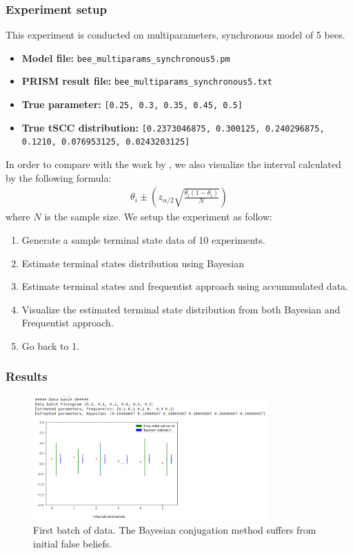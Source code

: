 \documentclass[12pt]{article}
\theoremstyle{definition}
\begin{document}
\subsubsection{Experiment setup}
This experiment is conducted on multiparameters, synchronous model of 5 bees.
\begin{itemize}
\item \textbf{Model file:} \texttt{bee\_multiparams\_synchronous5.pm}
\item \textbf{PRISM result file:} \texttt{bee\_multiparams\_synchronous5.txt}
\item \textbf{True parameter:} \texttt{[0.25, 0.3, 0.35, 0.45, 0.5]}
\item \textbf{True tSCC distribution:} \texttt{[0.2373046875, 0.300125, 0.240296875, 0.1210, 0.076953125, 0.0243203125]}
\end{itemize}
In order to compare with the work by \cite{hajnal2019data}, we also visualize
the interval calculated by the following formula:
\begin{align*}
  \theta_i \pm (z_{\alpha / 2}\sqrt{\frac{\theta_i(1-\theta_i)}{N}})
\end{align*}
where $N$ is the sample size. We setup the experiment as follow:
\begin{enumerate}
\item Generate a sample terminal state data of 10 experiments.
\item Estimate terminal states distribution using Bayesian
\item Estimate terminal states and frequentist approach using accummulated data.
\item Visualize the estimated terminal state distribution from both Bayesian and
  Frequentist approach.
\item Go back to 1.
\end{enumerate}

\subsubsection{Results}
\begin{figure}[H]
  \centering
  \includegraphics[width=0.8\textwidth,keepaspectratio]{figures/ex1_1.png}
  \caption{First batch of data. The Bayesian conjugation method suffers from
    initial false beliefs.}
\end{figure}
\end{document}
